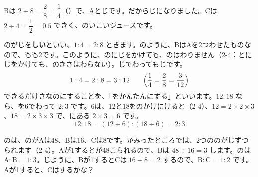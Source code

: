 Bは $2\div8=\dfrac{2}{8}=\dfrac{1}{4}$（）で、Aとじです。だからじになりました。Cは $2\div4=\dfrac{1}{2}=0.5$ できく、のいこいジュースです。

のがじを\textbf{しい}といい、$1:4=2:8$ ときます。のように、BはAを2つわせたものなので、もも2です。このように、のにじをかけても、のはわりません（2-4：とにじをかけても、のきさはわらない）。じでわってもじです。
\[ 1:4=2:8=3:12\qquad\Bigl(\frac{1}{4}=\frac{2}{8}=\frac{3}{12}\Bigr) \]
できるだけさなのにすることを、「をかんたんにする」といいます。$12:18$ なら、を6でわって $2:3$ です。6は、12と18をのかけにけると（2-4）、$12=2\times2\times3$、$18=2\times3\times3$ で、にある $2\times3=6$ です。
\[ 12:18=(12\div6):(18\div6)=2:3 \]


\leavevmode\label{bk:2-5:tsunagu}のは、のがAは48、Bは16、Cは8です。かみったところでは、2つののがじずつられます（2-4）。Aが1するとが48こられるので、Bは $48\div16=3$ します。のは $\mathrm{A}:\mathrm{B}=1:3$。じように、Bが1するとCは $16\div8=2$ するので、$\mathrm{B}:\mathrm{C}=1:2$ です。Aが1すると、Cはするかな？

